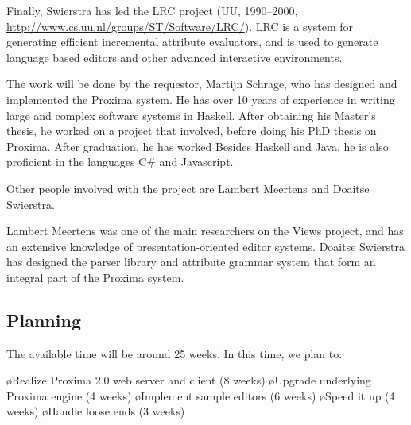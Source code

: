 \documentclass[10pt]{article}
\begin{document}
Finally, Swierstra has led the LRC project (UU, 1990--2000, 
\url{http://www.cs.uu.nl/groups/ST/Software/LRC/}). LRC is a system for generating 
efficient incremental attribute evaluators, and is used to generate 
language based editors and other advanced interactive environments.
\ec

The work will be done by the requestor, Martijn Schrage, who has designed and implemented the Proxima system. He has over 10 years of  experience in writing large and complex software systems in Haskell. After obtaining his Master's thesis, he worked on a project that involved, before doing his PhD thesis on Proxima. After graduation, he has worked 
Besides Haskell and Java, he is also proficient in the languages C\# and Javascript.

Other people involved with the project are Lambert Meertens and Doaitse Swierstra.

Lambert Meertens was one of the main researchers on the Views project, and has an extensive knowledge of presentation-oriented editor systems.
Doaitse Swierstra has designed the parser library and attribute grammar system that form an integral part of the Proxima system.


\subsection{Planning}

The available time will be around 25 weeks. In this time, we plan to:

\bl
\o Realize Proxima 2.0 web server and client (8 weeks)
\o Upgrade underlying Proxima engine (4 weeks)
\o Implement sample editors (6 weeks)
\o Speed it up (4 weeks)
\o Handle loose ends (3 weeks)
\el

\end{document}
